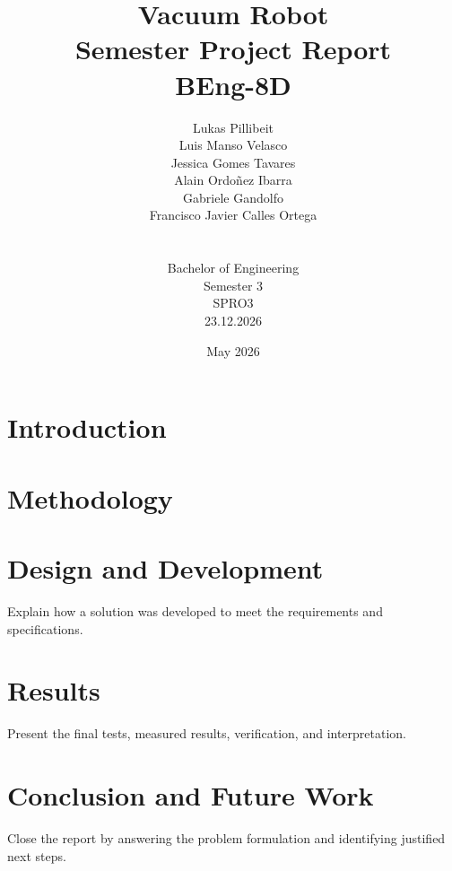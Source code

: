 \documentclass[a4paper, 12pt]{report}
\title{Vacuum Robot \\  \large Semester Project Report \\ BEng-8D}
\author{
    Lukas Pillibeit \\
    Luis Manso Velasco \\
    Jessica Gomes Tavares \\
    Alain Ordoñez Ibarra \\
    Gabriele Gandolfo \\
    Francisco Javier Calles Ortega \\
    \\
    \\
    Bachelor of Engineering \\
    Semester 3 \\
    SPRO3 \\
    23.12.2026
         }
\date{May 2026}
\begin{document}
\maketitle

\tableofcontents
\listoffigures
\listoftables
\printnomenclature
\clearpage


\chapter{Introduction}






\chapter{Methodology}






\chapter{Design and Development}
Explain how a solution was developed to meet the requirements and specifications. 







\chapter{Results}
Present the final tests, measured results, verification, and interpretation.






\chapter{Conclusion and Future Work}
Close the report by answering the problem formulation and identifying justified next steps.





\clearpage




\clearpage



\appendix
\end{document}

